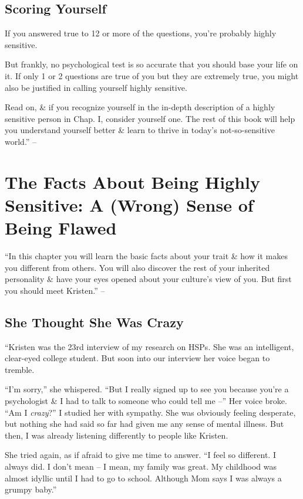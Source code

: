 \documentclass{article}
\numberwithin{equation}{section}
\begin{document}
\subsection*{Scoring Yourself}
If you answered true to 12 or more of the questions, you're probably highly sensitive.

But frankly, no psychological test is so accurate that you should base your life on it. If only 1 or 2 questions are true of you but they are extremely true, you might also be justified in calling yourself highly sensitive.

Read on, \& if you recognize yourself in the in-depth description of a highly sensitive person in Chap. I, consider yourself one. The rest of this book will help you understand yourself better \& learn to thrive in today's not-so-sensitive world.'' -- \cite[pp. 35--36]{Aron2013}


\section{The Facts About Being Highly Sensitive: A (Wrong) Sense of Being Flawed}
``In this chapter you will learn the basic facts about your trait \& how it makes you different from others. You will also discover the rest of your inherited personality \& have your eyes opened about your culture's view of you. But first you should meet Kristen.'' -- \cite[p. 37]{Aron2013}

\subsection{She Thought She Was Crazy}
``Kristen was the 23rd interview of my research on HSPs. She was an intelligent, clear-eyed college student. But soon into our interview her voice began to tremble.

``I'm sorry,'' she whispered. ``But I really signed up to see you because you're a psychologist \& I had to talk to someone who could tell me --'' Her voice broke. ``Am I \textit{crazy}?'' I studied her with sympathy. She was obviously feeling desperate, but nothing she had said so far had given me any sense of mental illness. But then, I was already listening differently to people like Kristen.

She tried again, as if afraid to give me time to answer. ``I feel so different. I always did. I don't mean -- I mean, my family was great. My childhood was almost idyllic until I had to go to school. Although Mom says I was always a grumpy baby.''
\end{document}
